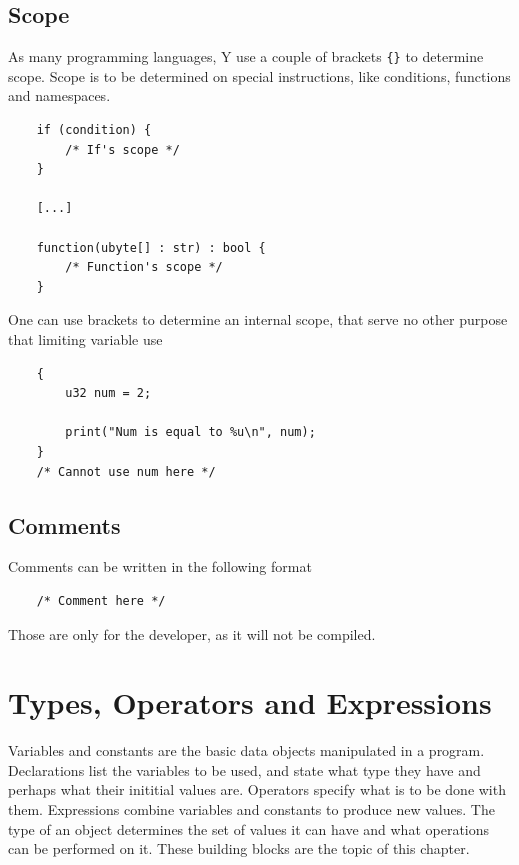 \documentclass{scrartcl}
\begin{document}
        \subsection{Scope}
            As many programming languages, Y use a couple of brackets \texttt{\{\}}
            to determine scope. Scope is to be determined on special instructions,
            like conditions, functions and namespaces.
            \begin{lstlisting}
    if (condition) {
        /* If's scope */
    }

    [...]

    function(ubyte[] : str) : bool {
        /* Function's scope */
    }
            \end{lstlisting}
            One can use brackets to determine an internal scope, that serve no
            other purpose that limiting variable use
            \begin{lstlisting}
    {
        u32 num = 2;

        print("Num is equal to %u\n", num);
    }
    /* Cannot use num here */
            \end{lstlisting}

        \subsection{Comments}
            Comments can be written in the following format
            \begin{lstlisting}
    /* Comment here */
            \end{lstlisting}
            Those are only for the developer, as it will not be compiled.

    \section{Types, Operators and Expressions}
        Variables and constants are the basic data objects manipulated in a
        program. Declarations list the variables to be used, and state what type
        they have and perhaps what their inititial values are. Operators
        specify what is to be done with them. Expressions combine variables and
        constants to produce new values. The type of an object determines the set
        of values it can have and what operations can be performed on it. These
        building blocks are the topic of this chapter.
\end{document}
